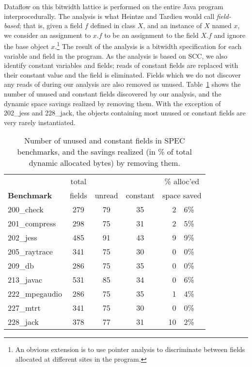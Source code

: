 \documentclass[preprint]{acmconf}
\begin{document}
Dataflow on this bitwidth lattice is performed on the entire Java
program interprocedurally.  The analysis is what Heintze and Tardieu
\cite{heintze01}
would call {\it field-based}; that is, given a field $f$ defined in
class $X$, and an instance of $X$ named $x$, we consider an assignment
to $x.f$ to be an assignment to the field $X.f$ and ignore the base
object $x$.\footnote{An obvious extension is to use pointer
analysis to discriminate between fields allocated at different sites
in the program.}  The result of the analysis is a bitwidth
specification for each variable and field in the program.  As the
analysis is based on SCC, we also identify constant variables and
fields; reads of constant fields are replaced with their constant
value and the field is eliminated.  Fields which we do not discover
any reads of during our analysis are also removed as unused.
Table~\ref{tab:const-unused} shows the number of unused and constant
fields discovered by our analysis, and the dynamic space savings
realized by removing them.  With the exception of 202\_jess and
228\_jack, the objects containing most unused or constant fields are
very rarely instantiated.
\begin{table}
\begin{tabular}{lcccr@{.}l}
&total&&&\multicolumn{2}{c}{\% alloc'ed}\\
\bf Benchmark & fields & unread & constant &
\multicolumn{2}{c}{space saved} \\\hline
200\_check	& 279 &   79   &   35   &  2&6\% \\
201\_compress	& 298 &   75   &   31   &  2&5\% \\
202\_jess	& 485 &   91   &   43   &  9&9\% \\
205\_raytrace	& 341 &   75   &   30   &  0&0\% \\
209\_db 	& 286 &   75   &   35   &  0&0\% \\
213\_javac	& 531 &   85   &   34   &  0&6\% \\
222\_mpegaudio	& 286 &   75   &   35   &  1&4\% \\
227\_mtrt	& 341 &   75   &   30   &  0&0\% \\
228\_jack	& 378 &   77   &   31   & 10&2\% \\
\end{tabular}
\caption{Number of unused and constant fields in SPEC benchmarks,
  and the savings realized (in \% of total dynamic allocated bytes) by
  removing them.}
\label{tab:const-unused}
\end{table}
\end{document}
